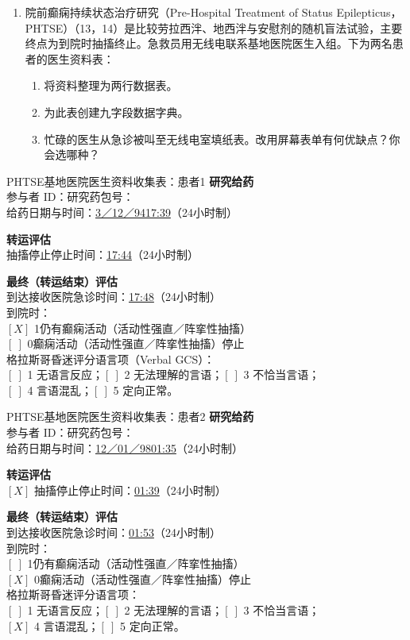 \begin{enumerate}
\item 院前癫痫持续状态治疗研究（Pre-Hospital Treatment of Status Epilepticus，PHTSE）（13，14）是比较劳拉西泮、地西泮与安慰剂的随机盲法试验，主要终点为到院时抽搐终止。急救员用无线电联系基地医院医生入组。下为两名患者的医生资料表：
\begin{enumerate}
\item 将资料整理为两行数据表。
\item 为此表创建九字段数据字典。
\item 忙碌的医生从急诊被叫至无线电室填纸表。改用屏幕表单有何优缺点？你会选哪种？
\end{enumerate}
\end{enumerate}
\begin{bookbox}{PHTSE\quad 基地医院医生资料收集表：患者1}
\small
\textbf{研究给药}\\
参与者 ID：\qquad 研究药包号：\\
给药日期与时间：\underline{3／12／94}\quad\underline{17:39}（24小时制）

\textbf{转运评估}\\
抽搐停止\qquad 停止时间：\underline{17:44}（24小时制）

\textbf{最终（转运结束）评估}\\
到达接收医院急诊时间：\underline{17:48}（24小时制）\\
到院时：\\
$[X]$ 1\quad 仍有癫痫活动（活动性强直／阵挛性抽搐）\\
$[\ ]$ 0\quad 癫痫活动（活动性强直／阵挛性抽搐）停止\\
格拉斯哥昏迷评分语言项（Verbal GCS）：\\
$[\ ]$ 1 无语言反应；$[\ ]$ 2 无法理解的言语；$[\ ]$ 3 不恰当言语；\\
$[\ ]$ 4 言语混乱；$[\ ]$ 5 定向正常。
\end{bookbox}
\begin{bookbox}{PHTSE\quad 基地医院医生资料收集表：患者2}
\small
\textbf{研究给药}\\
参与者 ID：\qquad 研究药包号：\\
给药日期与时间：\underline{12／01／98}\quad\underline{01:35}（24小时制）

\textbf{转运评估}\\
$[X]$ 抽搐停止\qquad 停止时间：\underline{01:39}（24小时制）

\textbf{最终（转运结束）评估}\\
到达接收医院急诊时间：\underline{01:53}（24小时制）\\
到院时：\\
$[\ ]$ 1\quad 仍有癫痫活动（活动性强直／阵挛性抽搐）\\
$[X]$ 0\quad 癫痫活动（活动性强直／阵挛性抽搐）停止\\
格拉斯哥昏迷评分语言项：\\
$[\ ]$ 1 无语言反应；$[\ ]$ 2 无法理解的言语；$[\ ]$ 3 不恰当言语；\\
$[X]$ 4 言语混乱；$[\ ]$ 5 定向正常。
\end{bookbox}
